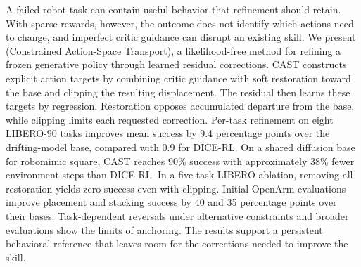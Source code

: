 A failed robot task can contain useful behavior that refinement should
retain. With sparse rewards, however, the outcome does not identify which
actions need to change, and imperfect critic guidance can disrupt an
existing skill. We present \method{} (Constrained Action-Space Transport),
a likelihood-free method for refining a frozen generative policy through
learned residual corrections. CAST constructs explicit action targets by
combining critic guidance with soft restoration toward the base and
clipping the resulting displacement. The residual then learns these targets
by regression. Restoration opposes accumulated departure from the base,
while clipping limits each requested correction. Per-task refinement on
eight LIBERO-90 tasks improves mean success by 9.4 percentage points over
the drifting-model base, compared with 0.9 for DICE-RL. On a shared diffusion
base for robomimic square, CAST reaches 90\% success with approximately
38\% fewer environment steps than DICE-RL. In a five-task LIBERO ablation,
removing all restoration yields zero success even with clipping. Initial
OpenArm evaluations improve placement and stacking success by 40 and
35 percentage points over their bases. Task-dependent reversals under
alternative constraints and broader evaluations show the limits of
anchoring. The results support a persistent behavioral reference that
leaves room for the corrections needed to improve the skill.
